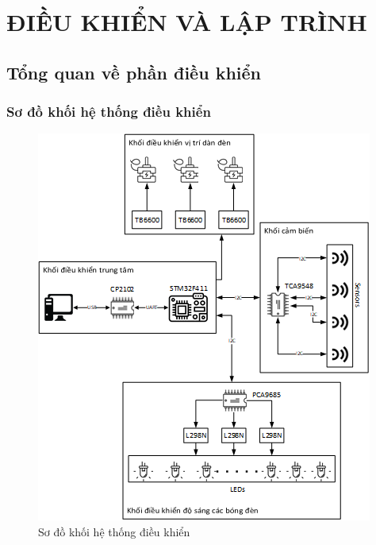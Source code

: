 \chapter{ĐIỀU KHIỂN VÀ LẬP TRÌNH}
\section{Tổng quan về phần điều khiển}
\subsection{Sơ đồ khối hệ thống điều khiển}
\begin{figure}[htp]
	\centering
	\includegraphics[scale=1]{Chapters/Chapter5/Images/Sodokhoihethong.png}
	\caption{Sơ đồ khối hệ thống điều khiển}
	\label{fig:C5Sodokhoihethong}
\end{figure}

